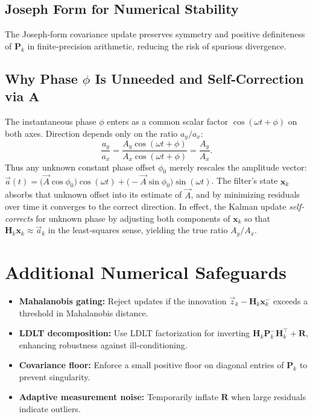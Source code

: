 \documentclass[11pt,letterpaper]{article}
\begin{document}
\subsection{Joseph Form for Numerical Stability}
The Joseph‐form covariance update preserves symmetry and positive definiteness of \(\bm{P}_k\) in finite‐precision arithmetic, reducing the risk of spurious divergence.

\subsection{Why Phase $\phi$ Is Unneeded and Self‐Correction via $\bm{A}$}
The instantaneous phase $\phi$ enters as a common scalar factor \(\cos(\omega t+\phi)\) on both axes.  Direction depends only on the ratio \(a_y/a_x\):
\[
\frac{a_y}{a_x}
= \frac{A_y\cos(\omega t+\phi)}{A_x\cos(\omega t+\phi)}
= \frac{A_y}{A_x}.
\]
Thus any unknown constant phase offset \(\phi_0\) merely rescales the amplitude vector: 
\(\vec{a}(t)=\bigl(\vec{A}\cos\phi_0\bigr)\cos(\omega t)+\bigl(-\vec{A}\sin\phi_0\bigr)\sin(\omega t)\).
The filter’s state \(\bm{x}_k\) absorbs that unknown offset into its estimate of \(\vec{A}\), and by minimizing residuals over time it converges to the correct direction.  In effect, the Kalman update \emph{self‐corrects} for unknown phase by adjusting both components of \(\bm{x}_k\) so that \(\bm{H}_k\bm{x}_k\approx\vec{a}_k\) in the least‐squares sense, yielding the true ratio \(A_y/A_x\).

\section{Additional Numerical Safeguards}
\begin{itemize}
  \item \textbf{Mahalanobis gating:} Reject updates if the innovation \(\vec{z}_k - \bm{H}_k\bm{x}_k^-\) exceeds a threshold in Mahalanobis distance.
  \item \textbf{LDLT decomposition:} Use LDLT factorization for inverting \(\bm{H}_k\bm{P}_k^-\bm{H}_k^\top + \bm{R}\), enhancing robustness against ill-conditioning.
  \item \textbf{Covariance floor:} Enforce a small positive floor on diagonal entries of \(\bm{P}_k\) to prevent singularity.
  \item \textbf{Adaptive measurement noise:} Temporarily inflate \(\bm{R}\) when large residuals indicate outliers.
\end{itemize}
\end{document}
